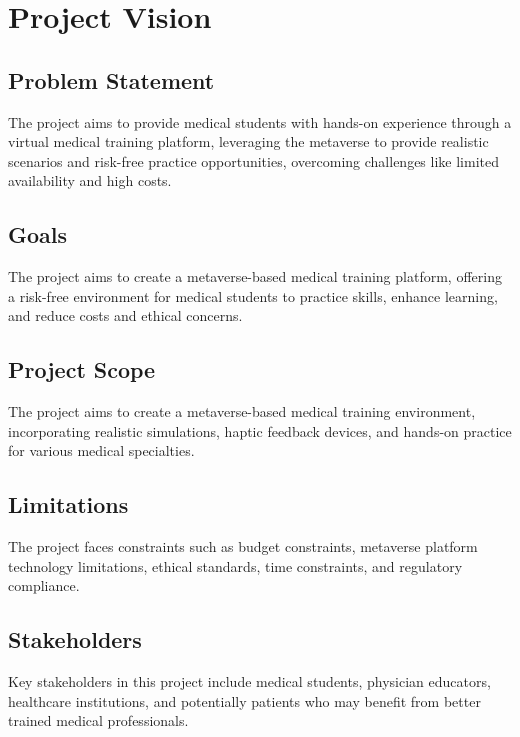 \chapter{Project Vision}
\label{ch:vision}
\section{Problem Statement}
The project aims to provide medical students with hands-on experience through a virtual medical training platform, leveraging the metaverse to provide realistic scenarios and risk-free practice opportunities, overcoming challenges like limited availability and high costs.

\section{Goals}
The project aims to create a metaverse-based medical training platform, offering a risk-free environment for medical students to practice skills, enhance learning, and reduce costs and ethical concerns.

\section{Project Scope}
The project aims to create a metaverse-based medical training environment, incorporating realistic simulations, haptic feedback devices, and hands-on practice for various medical specialties.
\section{Limitations}
The project faces constraints such as budget constraints, metaverse platform technology limitations, ethical standards, time constraints, and regulatory compliance.

\section{Stakeholders}
Key stakeholders in this project include medical students, physician educators, healthcare institutions, and potentially patients who may benefit from better trained medical professionals.
